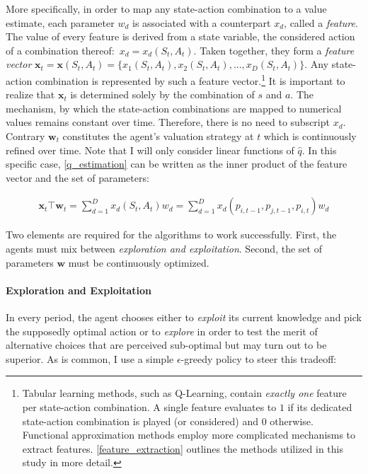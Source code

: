 More specifically, in order to map any state-action combination to a value estimate, each parameter $w_d$ is associated with a counterpart $x_d$, called a \emph{feature}. The value of every feature is derived  from a state variable, the considered action of a combination thereof:\ $x_d = x_d(S_t, A_t)$. Taken together, they form a \emph{feature vector} $\boldsymbol{x}_t = \boldsymbol{x}(S_t, A_t) = \{x_1(S_t, A_t), x_2(S_t, A_t), ..., x_D(S_t, A_t)\}$. Any state-action combination is represented by such a feature vector.\footnote{Tabular learning methods, such as Q-Learning, contain \emph{exactly one} feature per state-action combination. A single feature evaluates to $1$ if its dedicated state-action combination is played (or considered) and $0$ otherwise. Functional approximation methods employ more complicated mechanisms to extract features. \autoref{feature_extraction} outlines the methods utilized in this study in more detail.} It is important to realize that $\boldsymbol{x}_t$ is determined solely by the combination of $s$ and $a$. The mechanism, by which the state-action combinations are mapped to numerical values remains constant over time. Therefore, there is no need to subscript $x_d$. Contrary $\boldsymbol{w}_t$ constitutes the agent's valuation strategy at $t$ which is continuously refined over time. Note that I will only consider linear functions of $\hat{q}$. In this specific case, \autoref{q_estimation} can be written as the inner product of the feature vector and the set of parameters:

\begin{gather}\label{q_estimation_linear}
\boldsymbol{x}_t \top \boldsymbol{w}_t = \sum_{d=1}^{D} x_d(S_t, A_t) w_d = \sum_{d=1}^{D} x_d(p_{i, t-1}, p_{j, t-1}, p_{i, t}) w_d
\end{gather}

Two elements are required for the algorithms to work successfully. First, the agents must mix between \emph{exploration and exploitation}. Second, the set of parameters $\boldsymbol{w}$ must be continuously optimized.

\paragraph{Exploration and Exploitation} 
In every period, the agent chooses either to \emph{exploit} its current knowledge and pick the supposedly optimal action or to \emph{explore} in order to test the merit of alternative choices that are perceived sub-optimal but may turn out to be superior. As is common, I use a simple $\epsilon$-greedy policy to steer this tradeoff:

